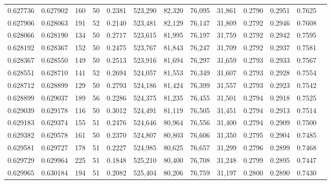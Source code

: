 \begin{tabular}{rrrrrrrrrrrrr}
0.627736 & 0.627902 &   160 &  50 &                                     0.2381 & 523,290 &  82,320 &  76,095 &  31,861 & 0.2790 & 0.2951 & 0.7625 \\
0.627906 & 0.628063 &   191 &  52 &                                     0.2140 & 523,481 &  82,129 &  76,147 &  31,809 & 0.2792 & 0.2946 & 0.7608 \\
0.628066 & 0.628190 &   134 &  50 &                                     0.2717 & 523,615 &  81,995 &  76,197 &  31,759 & 0.2792 & 0.2942 & 0.7595 \\
0.628192 & 0.628367 &   152 &  50 &                                     0.2475 & 523,767 &  81,843 &  76,247 &  31,709 & 0.2792 & 0.2937 & 0.7581 \\
0.628367 & 0.628550 &   149 &  50 &                                     0.2513 & 523,916 &  81,694 &  76,297 &  31,659 & 0.2793 & 0.2933 & 0.7567 \\
0.628551 & 0.628710 &   141 &  52 &                                     0.2694 & 524,057 &  81,553 &  76,349 &  31,607 & 0.2793 & 0.2928 & 0.7554 \\
0.628712 & 0.628899 &   129 &  50 &                                     0.2793 & 524,186 &  81,424 &  76,399 &  31,557 & 0.2793 & 0.2923 & 0.7542 \\
0.628899 & 0.629037 &   189 &  56 &                                     0.2286 & 524,375 &  81,235 &  76,455 &  31,501 & 0.2794 & 0.2918 & 0.7525 \\
0.629039 & 0.629178 &   116 &  50 &                                     0.3012 & 524,491 &  81,119 &  76,505 &  31,451 & 0.2794 & 0.2913 & 0.7514 \\
0.629183 & 0.629374 &   155 &  51 &                                     0.2476 & 524,646 &  80,964 &  76,556 &  31,400 & 0.2794 & 0.2909 & 0.7500 \\
0.629382 & 0.629578 &   161 &  50 &                                     0.2370 & 524,807 &  80,803 &  76,606 &  31,350 & 0.2795 & 0.2904 & 0.7485 \\
0.629581 & 0.629727 &   178 &  51 &                                     0.2227 & 524,985 &  80,625 &  76,657 &  31,299 & 0.2796 & 0.2899 & 0.7468 \\
0.629729 & 0.629964 &   225 &  51 &                                     0.1848 & 525,210 &  80,400 &  76,708 &  31,248 & 0.2799 & 0.2895 & 0.7447 \\
0.629965 & 0.630184 &   194 &  51 &                                     0.2082 & 525,404 &  80,206 &  76,759 &  31,197 & 0.2800 & 0.2890 & 0.7430 \\

\end{tabular}
